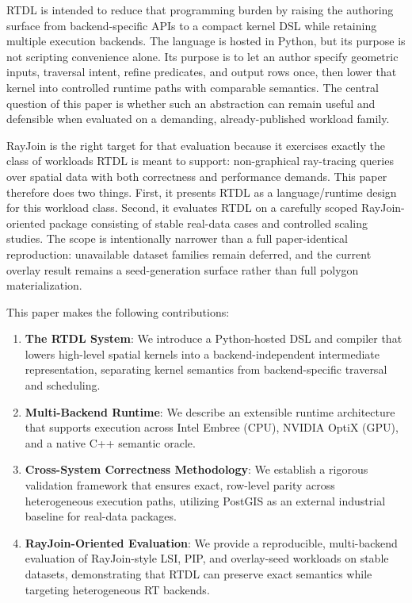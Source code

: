 \documentclass[conference]{IEEEtran}
\begin{document}
RTDL is intended to reduce that programming burden by raising the authoring
surface from backend-specific APIs to a compact kernel DSL while retaining
multiple execution backends. The language is hosted in Python, but its purpose
is not scripting convenience alone. Its purpose is to let an author specify
geometric inputs, traversal intent, refine predicates, and output rows once,
then lower that kernel into controlled runtime paths with comparable semantics.
The central question of this paper is whether such an abstraction can remain
useful and defensible when evaluated on a demanding, already-published workload
family.

RayJoin is the right target for that evaluation because it exercises exactly
the class of workloads RTDL is meant to support: non-graphical ray-tracing
queries over spatial data with both correctness and performance demands. This
paper therefore does two things. First, it presents RTDL as a language/runtime
design for this workload class. Second, it evaluates RTDL on a carefully scoped
RayJoin-oriented package consisting of stable real-data cases and controlled
scaling studies. The scope is intentionally narrower than a full paper-identical
reproduction: unavailable dataset families remain deferred, and the current
overlay result remains a seed-generation surface rather than full polygon
materialization.

This paper makes the following contributions:
\begin{enumerate}
\item \textbf{The RTDL System}: We introduce a Python-hosted DSL and compiler
that lowers high-level spatial kernels into a backend-independent intermediate
representation, separating kernel semantics from backend-specific traversal and
scheduling.
\item \textbf{Multi-Backend Runtime}: We describe an extensible runtime
architecture that supports execution across Intel Embree (CPU), NVIDIA OptiX
(GPU), and a native C++ semantic oracle.
\item \textbf{Cross-System Correctness Methodology}: We establish a rigorous
validation framework that ensures exact, row-level parity across heterogeneous
execution paths, utilizing PostGIS as an external industrial baseline for
real-data packages.
\item \textbf{RayJoin-Oriented Evaluation}: We provide a reproducible,
multi-backend evaluation of RayJoin-style LSI, PIP, and overlay-seed workloads
on stable datasets, demonstrating that RTDL can preserve exact semantics while
targeting heterogeneous RT backends.
\end{enumerate}
\end{document}
